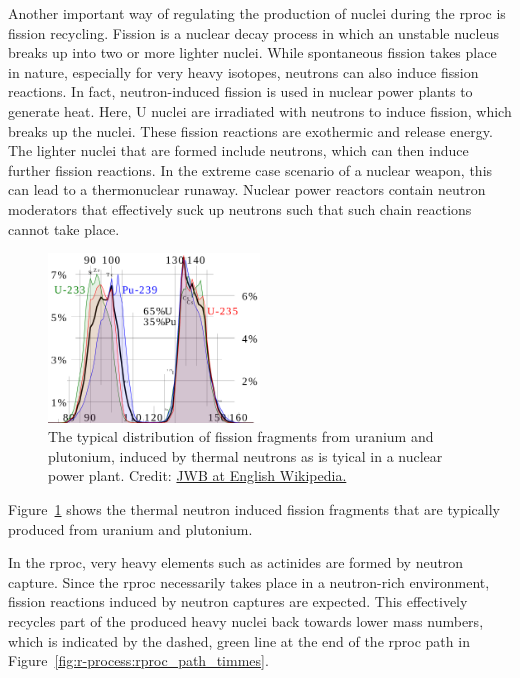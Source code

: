 Another important way of regulating the production of nuclei during the \ac{rproc} is fission recycling. Fission is a nuclear decay process in which an unstable nucleus breaks up into two or more lighter nuclei. While spontaneous fission takes place in nature, especially for very heavy isotopes, neutrons can also induce fission reactions. In fact, neutron-induced fission is used in nuclear power plants to generate heat. Here, U nuclei are irradiated with neutrons to induce fission, which breaks up the nuclei. These fission reactions are exothermic and release energy. The lighter nuclei that are formed include neutrons, which can then induce further fission reactions. In the extreme case scenario of a nuclear weapon, this can lead to a thermonuclear runaway. Nuclear power reactors contain neutron moderators that effectively suck up neutrons such that such chain reactions cannot take place.
\begin{figure}[tb]
    \centering
    \includegraphics[width=0.5\textwidth]{graphics/r-process/fission_fragments}
    \caption{The typical distribution of fission fragments from uranium and plutonium, induced by thermal neutrons as is tyical in a nuclear power plant. Credit: \href{https://en.wikipedia.org/wiki/Nuclear_fission}{JWB at English Wikipedia.}}
    \label{fig:r-process:fission_fragments}
\end{figure}
Figure~\ref{fig:r-process:fission_fragments} shows the thermal neutron induced fission fragments that are typically produced from uranium and plutonium. 

In the \ac{rproc}, very heavy elements such as actinides are formed by neutron capture. Since the \ac{rproc} necessarily takes place in a neutron-rich environment, fission reactions induced by neutron captures are expected. This effectively recycles part of the produced heavy nuclei back towards lower mass numbers, which is indicated by the dashed, green line at the end of the \ac{rproc} path in Figure~\ref{fig:r-process:rproc_path_timmes}.



